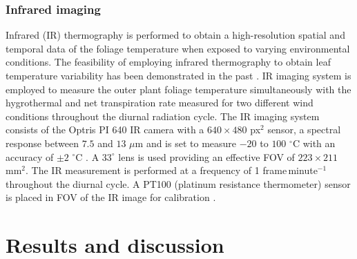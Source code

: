 \subsubsection*{Infrared imaging}
Infrared (IR) thermography is performed to obtain a high-resolution spatial and temporal data of the foliage temperature when exposed to varying environmental conditions. The feasibility of employing infrared thermography to obtain leaf temperature variability has been demonstrated in the past \citep{Jones1999,Merlot2002}. IR imaging system is employed to measure the outer plant foliage temperature simultaneously with the hygrothermal and net transpiration rate measured for two different wind conditions throughout the diurnal radiation cycle. The IR imaging system consists of the Optris PI 640 IR camera with a $640\times480$ px$^2$ sensor, a spectral response between $7.5$ and $13$ $\mu$m and is set to measure $-20$ to $100$ $^{\circ}$C  with an accuracy of $\pm2$ $^{\circ}$C  \citep{Allegrini2018,Tsalicoglou2018}. A $33^{\circ}$ lens is used providing an effective FOV of $223\times211$ mm$^2$. The IR measurement is performed at a frequency of 1 frame\,minute$^{-1}$ throughout the diurnal cycle. A PT100 (platinum resistance thermometer) sensor is placed in FOV of the IR image for calibration \citep{Allegrini2018}.


\section{Results and discussion}




